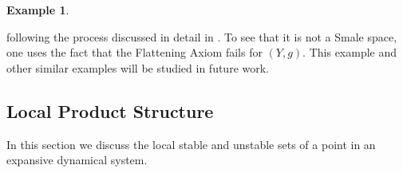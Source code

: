 \documentclass{amsart}
\theoremstyle{plain}
\theoremstyle{definition}
\newtheorem{example}[theorem]{Example}
\theoremstyle{remark}
\begin{document}
\begin{example}
\begin{center}
\end{center}

following the process discussed in detail in \cite[Section 5]{Yi2001}. To see that it is not a Smale space, one uses the fact that the Flattening Axiom fails for $(Y, g)$. This example and other similar examples will be studied in future work.
\end{example}

\subsection{Local Product Structure}\label{sec:local-stable-unstable}

In this section we discuss the local stable and unstable sets of a point in an expansive dynamical system.  
\end{document}
